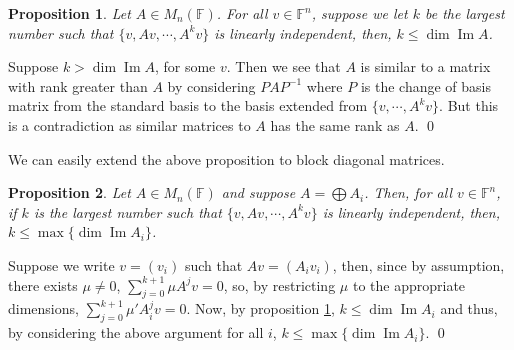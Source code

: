 \documentclass[
]{article}
\newtheorem{prop}{Proposition}[section]
\theoremstyle{definition}
\begin{document}
\begin{prop}\label{max_cyclic}
  Let \(A \in M_n (\mathbb{F})\). For all \(v \in \mathbb{F}^n\), suppose we 
  let \(k\) be the largest number such that \(\{v, Av, \cdots, A^kv\}\) is 
  linearly independent, then, \(k \le \dim \mathop{\mathrm{Im}}A\).
\end{prop}
\proof

Suppose \(k > \dim \mathop{\mathrm{Im}}A\), for some \(v\). Then we see
that \(A\) is similar to a matrix with rank greater than \(A\) by
considering \(PAP^{-1}\) where \(P\) is the change of basis matrix from
the standard basis to the basis extended from \(\{v, \cdots, A^kv\}\).
But this is a contradiction as similar matrices to \(A\) has the same
rank as \(A\). \qed

We can easily extend the above proposition to block diagonal matrices.

\begin{prop}
  Let \(A \in M_n (\mathbb{F})\) and suppose \(A = \bigoplus A_i\). 
  Then, for all \(v \in \mathbb{F}^n\), if \(k\) is the largest number such that 
  \(\{v, Av, \cdots, A^kv\}\) is linearly independent, then, 
  \(k \le \max \{\dim \mathop{\mathrm{Im}}A_i\}\).
\end{prop}
\proof

Suppose we write \(v = (v_i)\) such that \(Av = (A_i v_i)\), then, since
by assumption, there exists \(\mu \neq 0\),
\(\sum_{j = 0}^{k + 1} \mu A^j v = 0\), so, by restricting \(\mu\) to
the appropriate dimensions, \(\sum_{j = 0}^{k + 1} \mu' A_i^j v = 0\).
Now, by proposition \ref{max_cyclic},
\(k \le \dim \mathop{\mathrm{Im}}A_i\) and thus, by considering the
above argument for all \(i\),
\(k \le \max \{\dim \mathop{\mathrm{Im}}A_i\}\). \qed
\end{document}

